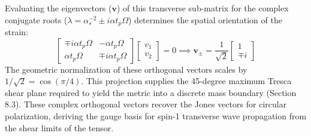 Evaluating the eigenvectors ($\mathbf{v}$) of this transverse sub-matrix for the complex conjugate roots ($\lambda = \alpha_s^{-2} \pm i \alpha t_p \Omega$) determines the spatial orientation of the strain: 
\begin{equation} 
    \begin{bmatrix} \mp i \alpha t_p \Omega & -\alpha t_p \Omega \\ \alpha t_p \Omega & \mp i \alpha t_p \Omega \end{bmatrix} \begin{bmatrix} v_1 \\ v_2 \end{bmatrix} = 0 \implies \mathbf{v}_\pm = \frac{1}{\sqrt{2}} \begin{bmatrix} 1 \\ \mp i \end{bmatrix} 
\end{equation} 
The geometric normalization of these orthogonal vectors scales by $1/\sqrt{2} = \cos(\pi/4)$. This projection supplies the 45-degree maximum Tresca shear plane required to yield the metric into a discrete mass boundary (Section 8.3). These complex orthogonal vectors recover the Jones vectors for circular polarization, deriving the gauge basis for spin-1 transverse wave propagation from the shear limits of the tensor.

